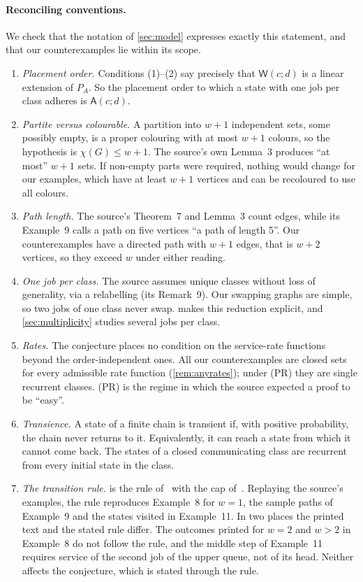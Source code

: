 \documentclass[11pt,a4paper]{article}
\theoremstyle{plain}
\theoremstyle{plain}
\newcommand{\W}{\mathsf{W}}
\newcommand{\Or}{\mathsf{A}}
\begin{document}
\paragraph{Reconciling conventions.} We check that the notation of \cref{sec:model} expresses exactly this statement, and that our counterexamples lie within its scope.
\begin{enumerate}[label=(\alph*),leftmargin=*]
\item \emph{Placement order.} Conditions (1)--(2) say precisely that $\W(c;d)$ is a linear extension of $P_A$. So the placement order to which a state with one job per class adheres is $\Or(c;d)$.
\item \emph{Partite versus colourable.} A partition into $w+1$ independent sets, some possibly empty, is a proper colouring with at most $w+1$ colours, so the hypothesis is $\chi(G)\le w+1$. The source's own Lemma~3 produces ``at most'' $w+1$ sets. If non-empty parts were required, nothing would change for our examples, which have at least $w+1$ vertices and can be recoloured to use all colours.
\item \emph{Path length.} The source's Theorem~7 and Lemma~3 count edges, while its Example~9 calls a path on five vertices ``a path of length 5''. Our counterexamples have a directed path with $w+1$ edges, that is $w+2$ vertices, so they exceed $w$ under either reading.
\item \emph{One job per class.} The source assumes unique classes without loss of generality, via a relabelling (its Remark~9). Our swapping graphs are simple, so two jobs of one class never swap.  makes this reduction explicit, and \cref{sec:multiplicity} studies several jobs per class.
\item \emph{Rates.} The conjecture places no condition on the service-rate functions beyond the order-independent ones. All our counterexamples are closed sets for every admissible rate function (\cref{rem:anyrates}); under (PR) they are single recurrent classes. (PR) is the regime in which the source expected a proof to be ``easy''.
\item \emph{Transience.} A state of a finite chain is transient if, with positive probability, the chain never returns to it. Equivalently, it can reach a state from which it cannot come back. The states of a closed communicating class are recurrent from every initial state in the class.
\item \emph{The transition rule.}  is the rule of~\cite{CD2021} with the cap of~\cite{DG2024}. Replaying the source's examples, the rule reproduces Example~8 for $w=1$, the sample paths of Example~9 and the states visited in Example~11. In two places the printed text and the stated rule differ. The outcomes printed for $w=2$ and $w>2$ in Example~8 do not follow the rule, and the middle step of Example~11 requires service of the second job of the upper queue, not of its head. Neither affects the conjecture, which is stated through the rule.
\end{enumerate}
\end{document}
